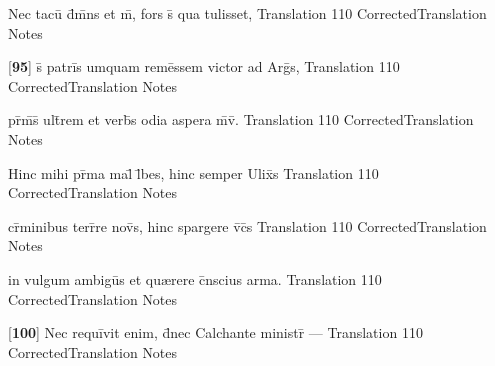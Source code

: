 \latline
  {Nec tacu\={\macron {\i}} d\={}m\={}ns et m\={}, fors s\={\macron {\i}} qua tulisset,}
  { Translation }
  {110}
  { CorrectedTranslation }
  { Notes }


\latline
  {[\textbf{95}] s\={\macron {\i}} patri\={}s umquam reme\={}ssem victor ad Arg\={}s,}
  { Translation }
  {110}
  { CorrectedTranslation }
  { Notes }


\latline
  {pr\={}m\={\macron {\i}}s\={\macron {\i}} ult\={}rem et verb\={\macron {\i}}s odia aspera m\={}v\={\macron {\i}}.}
  { Translation }
  {110}
  { CorrectedTranslation }
  { Notes }


\latline
  {Hinc mihi pr\={\macron {\i}}ma mal\={\macron {\i}} l\={}bes, hinc semper Ulix\={}s}
  { Translation }
  {110}
  { CorrectedTranslation }
  { Notes }


\latline
  {cr\={\macron {\i}}minibus terr\={}re nov\={\macron {\i}}s, hinc spargere v\={}c\={}s}
  { Translation }
  {110}
  { CorrectedTranslation }
  { Notes }


\latline
  {in vulgum ambigu\={}s et qu{\ae}rere c\={}nscius arma.}
  { Translation }
  {110}
  { CorrectedTranslation }
  { Notes }


\latline
  {[\textbf{100}] Nec requi\={}vit enim, d\={}nec Calchante ministr\={} ---}
  { Translation }
  {110}
  { CorrectedTranslation }
  { Notes }


